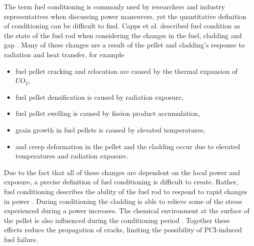 \documentclass[edeposit,fullpage,11pt]{uiucthesis2009}
\begin{document}
The term fuel conditioning is commonly used by researchers and industry representatives when discussing power maneuvers, yet the quantitative definition of conditioning can be difficult to find.
Capps et al. described fuel condition as the state of the fuel rod when considering the changes in the fuel, cladding and gap \cite{capps_evaluation_2016}.
Many of these changes are a result of the pellet and cladding's response to radiation and heat transfer, for example
\begin{itemize}
\item fuel pellet cracking and relocation are caused by the thermal expansion of $UO_2$,
\item fuel pellet densification is caused by radiation exposure,
\item fuel pellet swelling is caused by fission product accumulation,
\item grain growth in fuel pellets is caused by elevated temperatures,
\item and creep deformation in the pellet and the cladding occur due to elevated temperatures and radiation exposure.
\end{itemize}
Due to the fact that all of these changes are dependent on the local power and exposure, a precise definition of fuel conditioning is difficult to create.
Rather, fuel conditioning describes the ability of the fuel rod to respond to rapid changes in power \cite{capps_evaluation_2016}.
During conditioning the cladding is able to relieve some of the stress experienced during a power increases.
The chemical environment at the surface of the pellet is also influenced during the conditioning period \cite{cox_pellet-clad_1990}.
Together these effects reduce the propagation of cracks, limiting the possibility of \gls{PCI}-induced fuel failure.
\end{document}
